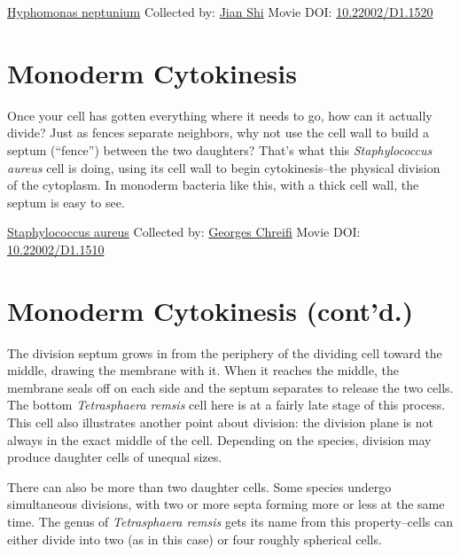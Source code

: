 \documentclass[]{tufte-book}
\begin{document}
\hypertarget{htmlwidget-ad6c5ef49e0e67490d61}{}

\label{fig:5-3b}\protect\hyperlink{tree}{Hyphomonas neptunium} Collected by: \protect\hyperlink{jian_shi}{Jian Shi} Movie DOI: \href{https://doi.org/10.22002/D1.1520}{10.22002/D1.1520}

\hypertarget{monoderm-cytokinesis}{%
\section{Monoderm Cytokinesis}\label{monoderm-cytokinesis}}

Once your cell has gotten everything where it needs to go, how can it actually divide? Just as fences separate neighbors, why not use the cell wall to build a septum (``fence'') between the two daughters? That's what this \emph{Staphylococcus aureus} cell is doing, using its cell wall to begin cytokinesis--the physical division of the cytoplasm. In monoderm bacteria like this, with a thick cell wall, the septum is easy to see.



\hypertarget{htmlwidget-438f5fd50a63a40fb366}{}

\label{fig:5-4}\protect\hyperlink{tree}{Staphylococcus aureus} Collected by: \protect\hyperlink{georges_chreifi}{Georges Chreifi} Movie DOI: \href{https://doi.org/10.22002/D1.1510}{10.22002/D1.1510}

\hypertarget{monoderm-cytokinesis-contd.}{%
\section{Monoderm Cytokinesis (cont'd.)}\label{monoderm-cytokinesis-contd.}}

The division septum grows in from the periphery of the dividing cell toward the middle, drawing the membrane with it. When it reaches the middle, the membrane seals off on each side and the septum separates to release the two cells. The bottom \emph{Tetrasphaera remsis} cell here is at a fairly late stage of this process. This cell also illustrates another point about division: the division plane is not always in the exact middle of the cell. Depending on the species, division may produce daughter cells of unequal sizes.

There can also be more than two daughter cells. Some species undergo simultaneous divisions, with two or more septa forming more or less at the same time. The genus of \emph{Tetrasphaera remsis} gets its name from this property--cells can either divide into two (as in this case) or four roughly spherical cells.
\end{document}
